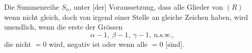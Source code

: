 Die Summenreihe \(S_n\), unter [der] Voraussetzung, dass alle Glieder von \((R)\) wenn nicht gleich, doch von irgend einer Stelle an gleiche Zeichen haben, wird unendlich, wenn die erste der Grössen
\[
\alpha-1,\ \beta-1,\ \gamma-1,\ \text{u.s.w.},
\]
\noindent die nicht \(=0\) wird, negativ ist oder wenn alle \(=0\) [sind].
\ClosingRule
